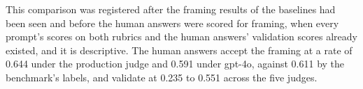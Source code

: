 This comparison was registered after the framing results of the baselines
had been seen and before the human answers were scored for framing, when
every prompt's scores on both rubrics and the human answers' validation
scores already existed, and it is descriptive.
The human answers accept the framing at a rate of 0.644 under the production
judge and 0.591 under gpt-4o, against 0.611 by the benchmark's labels, and
validate at 0.235 to 0.551 across the five judges.

